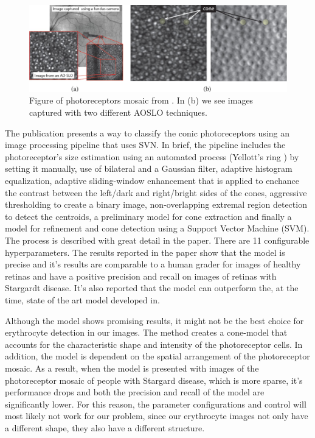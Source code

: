 \documentclass[]{article}
\begin{document}
\begin{figure}[ht]
	\centering
	\includegraphics[width=\textwidth]{bergelles-photoreceptord.jpg}
	\caption{Figure of photoreceptors mosaic from \cite{bergeles_unsupervised_2017}.
		In (b) we see images captured with two different AOSLO techniques.
	}
	\label{fig:bergelles-photoreceptors}
\end{figure}
 
The publication presents a way to classify the conic photoreceptors using an image processing pipeline that uses SVN.
In brief, the pipeline includes the photoreceptor's size estimation using an automated process (Yellott's ring\cite{cunefare_automatic_2016} \cite{cooper_automatic_2013}) by setting it manually, use of bilateral and a Gaussian filter, adaptive histogram equalization, adaptive sliding-window enhancement that is applied to enchance the contrast between the left/dark and right/bright sides of the cones, aggressive thresholding to create a binary image, non-overlapping extremal region detection to detect the centroids, a preliminary model for cone extraction and finally a model for refinement and cone detection using a Support Vector Machine (SVM). 
The process is described with great detail in the paper.
There are 11 configurable hyperparameters.
The results reported in the paper show that the model is precise and it's results are comparable to a human grader for images of healthy retinas and have a positive precision and recall on images of retinas with Stargardt disease.
It's also reported that the model can outperform the, at the time, state of the art model developed in\cite{cunefare_automatic_2016}.

Although the model shows promising results, it might not be the best choice for erythrocyte detection in our images. 
The method creates a cone-model that accounts for the characteristic shape and intensity of the photoreceptor cells.
In addition, the model is dependent on the spatial arrangement of the photoreceptor mosaic. 
As a result, when the model is presented with images of the photoreceptor mosaic of people with Stargard disease, which is more sparse, it's performance drops and both the precision and recall of the model are significantly lower.
For this reason, the parameter configurations and control will most likely not work for our problem, since our erythrocyte images not only have a different shape, they also have a different structure.
\end{document}
